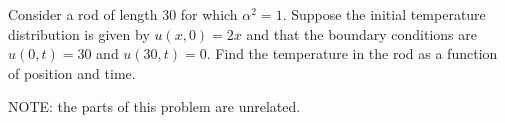 \documentclass[11pt]{exam}
\begin{document}
\newpage
\begin{questions}









\question[12] Consider a rod of length 30 for which $\alpha^2 =
1$. Suppose the initial temperature distribution is given by $u(x,0) =
2x$ and that the boundary conditions are $u(0,t) = 30$ and $u(30,t) =
0$. Find the temperature in the rod as a function of position and
time.

\newpage

\question[12] NOTE: the parts of this problem are unrelated. 
\end{questions}
\end{document}
